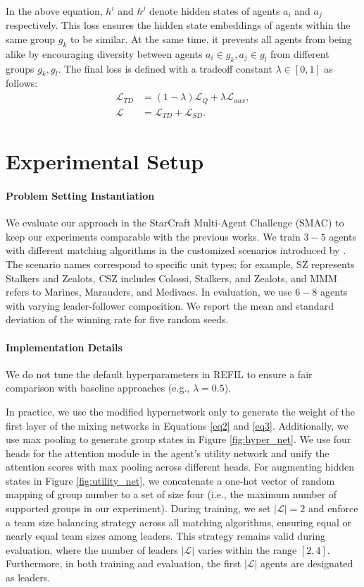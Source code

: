 \documentclass[10pt]{article} %
\begin{document}
In the above equation, $h^i$ and $h^j$ denote hidden states of agents $a_i$ and $a_j$ respectively. This loss ensures the hidden state embeddings of agents within the same group $g_k$ to be similar. At the same time, it prevents all agents from being alike by encouraging diversity between agents $ a_i \in g_k, a_j \in g_l$ from different groups $g_k, g_l$. The final loss is defined with a tradeoff constant $\lambda \in [0,1]$ as follows:
\begin{align*}
    \mathcal{L}_{\textit{TD}} &= (1 - \lambda) \mathcal{L}_{Q} + \lambda \mathcal{L}_{\textit{aux}}, \\
\mathcal{L} &= \mathcal{L}_{\textit{TD}} + \mathcal{L}_{\textit{SD}}.
\end{align*}

\section{Experimental Setup} \label{experimental_setup}

\paragraph{Problem Setting Instantiation} We evaluate our approach in the StarCraft Multi-Agent Challenge (SMAC) \citep{samvelyan19smac} to keep our experiments comparable with the previous works.
We train $3-5$ agents with different matching algorithms in the customized scenarios introduced by \citet{ye2024mutual}. The scenario names correspond to specific unit types; for example, SZ represents Stalkers and Zealots, CSZ includes Colossi, Stalkers, and Zealots, and MMM refers to Marines, Marauders, and Medivacs. In evaluation, we use $6-8$ agents with varying leader-follower composition. We report the mean and standard deviation of the winning rate for five random seeds.

\paragraph{Implementation Details} We do not tune the default hyperparameters in REFIL to ensure a fair comparison with baseline approaches (e.g., $\lambda = 0.5$). 

In practice, we use the modified hypernetwork only to generate the weight of the first layer of the mixing networks in Equations \ref{eq2} and \ref{eq3}. Additionally, we use max pooling to generate group states in Figure \ref{fig:hyper_net}. We use four heads for the attention module in the agent's utility network and unify the attention scores with max pooling across different heads. For augmenting hidden states in Figure \ref{fig:utility_net}, we concatenate a one-hot vector of random mapping of group number to a set of size four (i.e., the maximum number of supported groups in our experiment). 
During training, we set  $|\mathcal{L}|=2$
and enforce a team size balancing strategy across all matching algorithms, ensuring equal or nearly equal team sizes among leaders. This strategy remains valid during evaluation, where the number of leaders 
$|\mathcal{L}|$ varies within the range $[2,4]$. Furthermore, in both training and evaluation, the first $|\mathcal{L}|$ agents are designated as leaders. 
\end{document}
